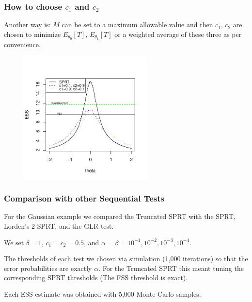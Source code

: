 \documentclass[10pt]{beamer}
\begin{document}
\begin{frame}
\frametitle{How to choose $c_1$ and $c_2$}

Another way is: $M$ can be set to a maximum allowable value and then $c_1$, $c_2$ are chosen to minimize $E_{\theta_0}[T]$, $E_{\theta_1}[T]$ or a weighted average of these three as per convenience.

\begin{figure}
\centering
\includegraphics[height=0.7\textheight, width=0.6\textwidth]{IndustrialChoice.pdf}
\end{figure}

\end{frame}

\begin{frame}
\frametitle{Comparison with other Sequential Tests}
For the Gaussian example we compared the Truncated SPRT with the SPRT, Lorden's 2-SPRT, and the GLR test.

We set $\delta = 1$, $c_1 = c_2 = 0.5$, and $\alpha = \beta = 10^{-1}, 10^{-2}, 10^{-3}, 10^{-4}$.

The thresholds of each test we chosen via simulation (1,000 iterations) so that the error probabilities are exactly $\alpha$. For the Truncated SPRT this meant tuning the corresponding SPRT thresholds (The FSS threshold is exact).

Each ESS estimate was obtained with 5,000 Monte Carlo samples.
\end{frame}
\end{document}

